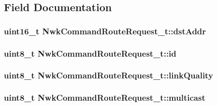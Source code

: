 \subsection{Field Documentation}
\hypertarget{struct_nwk_command_route_request__t_a801a38c63bb90cec2abf55609cc5e7c2}{
\subsubsection[{dst\-Addr}]{\setlength{\rightskip}{0pt plus 5cm}uint16\-\_\-t Nwk\-Command\-Route\-Request\-\_\-t\-::dst\-Addr}}\label{struct_nwk_command_route_request__t_a801a38c63bb90cec2abf55609cc5e7c2}
\hypertarget{struct_nwk_command_route_request__t_af8676c312b3c53d469645952a6979a89}{
\subsubsection[{id}]{\setlength{\rightskip}{0pt plus 5cm}uint8\-\_\-t Nwk\-Command\-Route\-Request\-\_\-t\-::id}}\label{struct_nwk_command_route_request__t_af8676c312b3c53d469645952a6979a89}
\hypertarget{struct_nwk_command_route_request__t_a27f2b9f8905690fe4d88c8fe6d7e8ba5}{
\subsubsection[{link\-Quality}]{\setlength{\rightskip}{0pt plus 5cm}uint8\-\_\-t Nwk\-Command\-Route\-Request\-\_\-t\-::link\-Quality}}\label{struct_nwk_command_route_request__t_a27f2b9f8905690fe4d88c8fe6d7e8ba5}
\hypertarget{struct_nwk_command_route_request__t_a573ae662972add7e9f85fbdfc9259210}{
\subsubsection[{multicast}]{\setlength{\rightskip}{0pt plus 5cm}uint8\-\_\-t Nwk\-Command\-Route\-Request\-\_\-t\-::multicast}}\label{struct_nwk_command_route_request__t_a573ae662972add7e9f85fbdfc9259210}
